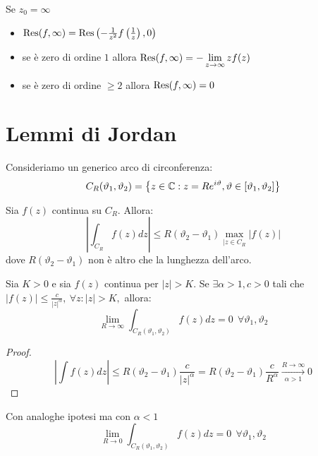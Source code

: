 Se $z_{0} = \infty $
\begin{itemize}
\item $\operatorname{Res} (f, \infty) = \operatorname{Res} \left(- \frac{1}{z^{2}} f\left(\frac{1}{z}\right), 0\right)$
\item se è zero di ordine $1$ allora $\operatorname{Res} (f, \infty) = - \lim\limits_{z\rightarrow \infty} zf(z)$
\item se è zero di ordine $ \geq 2$ allora $\operatorname{Res} (f, \infty) = 0$
\end{itemize}

\section{Lemmi di Jordan}

Consideriamo un generico arco di circonferenza:
\begin{equation*}
C_{R}(\vartheta_{1}, \vartheta_{2}) = \left\{z\in \mathbb{C} : z = Re^{i\vartheta}, \vartheta \in [\vartheta_{1}, \vartheta_{2}]\right\}
\end{equation*}
\begin{thm}
Sia $f(z)$ continua su $C_{R}$. Allora:
\begin{equation*}
\left| \int_{C_{R}} f(z)dz\right| \leq R(\vartheta_{2} - \vartheta_{1})\max_{|z\in C_{R}}| f(z)|
\end{equation*}
dove $R(\vartheta_{2} - \vartheta_{1})$ non è altro che la lunghezza dell'arco.
\end{thm}
\begin{thm}
Sia $K > 0$ e sia $f(z)$ continua per $|z| > K$. Se $\exists \alpha > 1, c > 0$ tali che $|f(z)| \leq \frac{c}{|z|^{\alpha}}, \ \forall z: |z| > K, $ allora:
\begin{equation*}
\lim_{R\rightarrow \infty}\int_{C_{R}(\vartheta_{1}, \vartheta_{2})} f(z)dz = 0\ \ \forall \vartheta_{1}, \vartheta_{2}
\end{equation*}
\end{thm}
\begin{proof}
\begin{equation*}
\left| \int f(z) dz\right| \leq R(\vartheta_{2} - \vartheta_{1})\frac{c}{|z|^{\alpha}} = R(\vartheta_{2} - \vartheta_{1})\frac{c}{R^{\alpha}}\xrightarrow[\alpha > 1]{R\rightarrow \infty} 0
\end{equation*}
\end{proof}
\begin{thm}
Con analoghe ipotesi ma con $\alpha < 1$
\begin{equation*}
\lim_{R\rightarrow 0}\int_{C_{R}(\vartheta_{1}, \vartheta_{2})} f(z)dz = 0\ \ \forall \vartheta_{1}, \vartheta_{2}
\end{equation*}
\end{thm}
